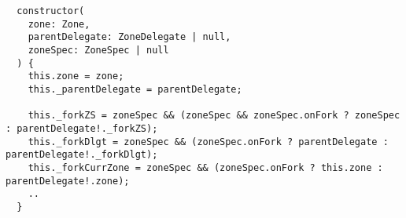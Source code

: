 \begin{verbatim}
  constructor(
    zone: Zone,
    parentDelegate: ZoneDelegate | null,
    zoneSpec: ZoneSpec | null
  ) {
    this.zone = zone;
    this._parentDelegate = parentDelegate;

    this._forkZS = zoneSpec && (zoneSpec && zoneSpec.onFork ? zoneSpec : parentDelegate!._forkZS);
    this._forkDlgt = zoneSpec && (zoneSpec.onFork ? parentDelegate : parentDelegate!._forkDlgt);
    this._forkCurrZone = zoneSpec && (zoneSpec.onFork ? this.zone : parentDelegate!.zone);
    ..
  }
\end{verbatim}
